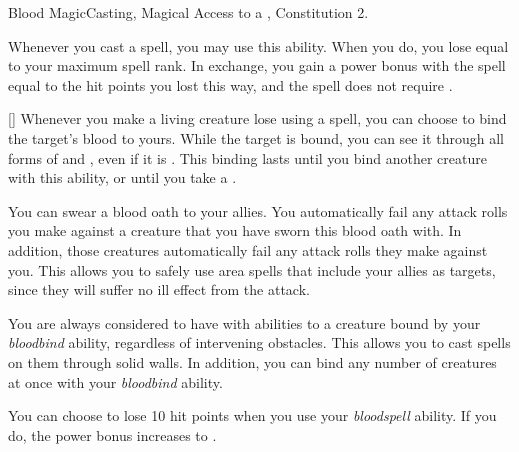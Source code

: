     \begin{feat}{Blood Magic}{Casting, Magical}
        \featpre Access to a , Constitution 2.

         Whenever you cast a spell, you may use this ability.
        When you do, you lose  equal to your maximum spell rank.
        In exchange, you gain a power bonus with the spell equal to the hit points you lost this way, and the spell does not require .

        [] Whenever you make a living creature lose  using a spell, you can choose to bind the target's blood to yours.
        While the target is bound, you can see it through all forms of  and , even if it is .
        This binding lasts until you bind another creature with this ability, or until you take a .

         You can swear a blood oath to your allies.
        You automatically fail any attack rolls you make against a creature that you have sworn this blood oath with.
        In addition, those creatures automatically fail any attack rolls they make against you.
        This allows you to safely use area spells that include your allies as targets, since they will suffer no ill effect from the attack.

         You are always considered to have  with  abilities to a creature bound by your \textit{bloodbind} ability, regardless of intervening obstacles.
        This allows you to cast spells on them through solid walls.
        In addition, you can bind any number of creatures at once with your \textit{bloodbind} ability.

         You can choose to lose 10 hit points when you use your \textit{bloodspell} ability.
        If you do, the power bonus increases to .
    \end{feat}

